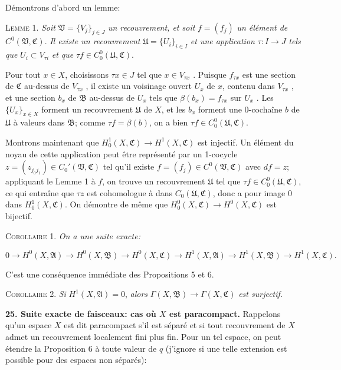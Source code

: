 Démontrons d'abord un lemme:

\textsc{Lemme} 1. \textit{Soit} $\mathfrak{V} = \{V_j\}_{j \in J}$ \textit{un recouvrement, et soit} $f = (f_j)$ \textit{un élément de} $C^0(\mathfrak{V}, \mathfrak{C})$. \textit{Il existe un recouvrement} $\mathfrak{U} = \{U_i\}_{i \in I}$ \textit{et une application} $\tau: I \rightarrow J$ \textit{tels que} $U_i \subset V_{\tau i}$ \textit{et que} $\tau f \in C_0^0(\mathfrak{U}, \mathfrak{C})$.

Pour tout $x \in X$, choisissons $\tau x \in J$ tel que $x \in V_{\tau x}$ . Puisque $f_{\tau x}$ est une section de $\mathfrak{C}$ au-dessus de $V_{\tau x}$ , il existe un voisinage ouvert $U_x$ de $x$, contenu dans $V_{\tau x}$ , et une section $b_x$ de $\mathfrak{B}$ au-dessus de $U_x$ tels que $\beta(b_x) = f_{\tau x}$ sur $U_x$ . Les $\{U_x\}_{x \in X}$ forment un recouvrement $\mathfrak{U}$ de $X$, et les $b_x$ forment une 0-cochaîne $b$ de $\mathfrak{U}$ à valeurs dans $\mathfrak{B}$; comme $\tau f = \beta(b)$, on a bien $\tau f \in C_0^0(\mathfrak{U}, \mathfrak{C})$.

Montrons maintenant que $H_0^1(X, \mathfrak{C}) \rightarrow H^1(X, \mathfrak{C})$ est injectif. Un élément du noyau de cette application peut être représenté par un 1-cocycle $z = (z_{j_0 j_1}) \in C_0'(\mathfrak{V}, \mathfrak{C})$ tel qu'il existe $f = (f_j) \in C^0(\mathfrak{V}, \mathfrak{C})$ avec $df = z$; appliquant le Lemme 1 à $f$, on trouve un recouvrement $\mathfrak{U}$ tel que $\tau f \in C_0^0(\mathfrak{U}, \mathfrak{C})$, ce qui entraîne que $\tau z$ est cohomologue à \quad dans $C_0(\mathfrak{U}, \mathfrak{C})$, donc a pour image 0 dans $H_0^1(X, \mathfrak{C})$. On démontre de même que $H_0^0(X, \mathfrak{C}) \rightarrow H^0(X, \mathfrak{C})$ est bijectif.

\textsc{Corollaire} 1. \textit{On a une suite exacte:}

\begin{equation*}
0 \rightarrow H^0(X, \mathfrak{A}) \rightarrow H^0(X, \mathfrak{B}) \rightarrow H^0(X, \mathfrak{C}) \rightarrow H^1(X, \mathfrak{A}) \rightarrow H^1(X, \mathfrak{B}) \rightarrow H^1(X, \mathfrak{C}).
\end{equation*}

C'est une conséquence immédiate des Propositions 5 et 6.

\textsc{Corollaire} 2. \textit{Si} $H^1(X, \mathfrak{A}) = 0$, \textit{alors} $\Gamma(X, \mathfrak{B}) \rightarrow \Gamma(X, \mathfrak{C})$ \textit{est surjectif.}

\textbf{25. Suite exacte de faisceaux: cas où $X$ est paracompact.} Rappelons qu'un espace $X$ est dit paracompact s'il est séparé et si tout recouvrement de $X$ admet un recouvrement localement fini plus fin. Pour un tel espace, on peut étendre la Proposition 6 à toute valeur de $q$ (j'ignore si une telle extension est possible pour des espaces non séparés):
